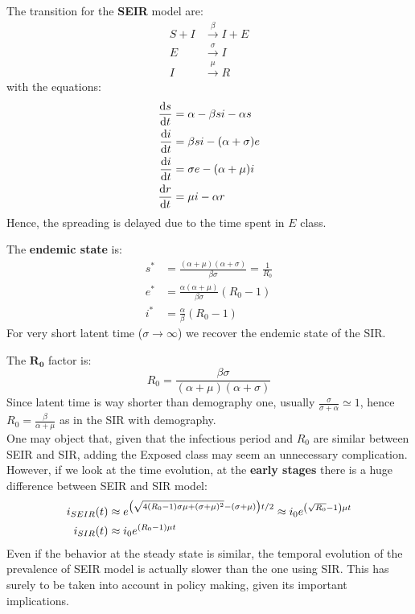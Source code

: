 \documentclass[../main/main.tex]{subfiles}
\begin{document}
The transition for the \textbf{SEIR} model are:
\begin{equation}
\begin{split}
 S + I &\overset{\beta }{\rightarrow } I + E   \\
 E & \overset{\sigma }{\rightarrow } I  \\
 I & \overset{\mu }{\rightarrow } R
\end{split}
\end{equation}
with the equations:
\begin{equation}
  \begin{split}
    \dv{s}{t} &= \alpha -\beta s i - \alpha s \\
  \dv{i}{t} &= \beta s i - (\alpha + \sigma )e \\
  \dv{i}{t} &= \sigma e - (\alpha + \mu )i \\
  \dv{r}{t} &= \mu i - \alpha r
\end{split}
\end{equation}
Hence, the spreading is delayed due to the time spent in \( E \) class.

The \textbf{endemic state} is:
\begin{equation}
\begin{split}
s^*  &=  \frac{(\alpha +\mu )(\alpha + \sigma )}{\beta \sigma } = \frac{1}{R_0} \\
e^* &= \frac{\alpha (\alpha +\mu )}{\beta \sigma } (R_0 -1)\\
i^* &= \frac{\alpha }{\beta } (R_0 -1)
\end{split}
\end{equation}
For very short latent time (\( \sigma \rightarrow \infty  \)) we recover the endemic state of the SIR.

The \( \mathbf{R_0} \) factor is:
\begin{equation}
  R_0 = \frac{\beta \sigma }{(\alpha + \mu )(\alpha +\sigma )}
\end{equation}
Since latent time is way shorter than demography one, usually \( \frac{\sigma }{\sigma + \alpha } \simeq 1 \), hence \( R_0 = \frac{\beta }{\alpha + \mu } \) as in the SIR with demography.\\

One may object that, given that the infectious period and $R_0$ are similar between SEIR and SIR, adding the Exposed class may seem an unnecessary complication. However, if we look at the time evolution, at the \textbf{early stages} there is a huge difference between SEIR and SIR model:
\begin{equation}
\begin{split}
  i_{SEIR} (t) & \approx e^{\qty(\sqrt{4(R_0-1)\sigma \mu  + (\sigma + \mu )^2} -(\sigma +\mu ))t/2 } \approx i_0 e^{\qty(\sqrt{R_0} -1 ) \mu t} \\
    i_{SIR} (t) &\approx i_0 e^{(R_0-1) \mu t}
\end{split}
\end{equation}
Even if the behavior at the steady state is similar, the temporal evolution of the prevalence of SEIR model is actually slower than the one using SIR. This has surely to be taken into account in policy making, given its important implications.\\
\end{document}
